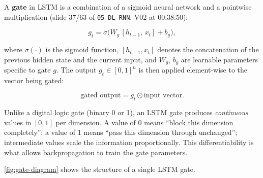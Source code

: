 \documentclass[12pt,a4paper]{article}
\begin{document}
A \textbf{gate} in LSTM is a combination of a sigmoid neural network and a
pointwise multiplication (slide 37/63 of \texttt{05-DL-RNN}, V02 at
00:38:50):

\begin{equation}
  \label{eq:gate-generic}
  g_t = \sigma\!\bigl(W_g\,[h_{t-1},\,x_t] + b_g\bigr),
\end{equation}

where $\sigma(\cdot)$ is the sigmoid function, $[h_{t-1}, x_t]$ denotes
the concatenation of the previous hidden state and the current input, and
$W_g$, $b_g$ are learnable parameters specific to gate $g$. The output
$g_t \in [0,1]^n$ is then applied element-wise to the vector being gated:

\begin{equation}
  \label{eq:gate-apply}
  \text{gated output} = g_t \odot \text{input vector}.
\end{equation}

\begin{keyinsight}[title=Sigmoid as a Soft Gate]
  Unlike a digital logic gate (binary 0 or 1), an LSTM gate produces
  \emph{continuous} values in $[0,1]$ per dimension. A value of 0 means
  ``block this dimension completely''; a value of 1 means ``pass this
  dimension through unchanged''; intermediate values scale the
  information proportionally. This differentiability is what allows
  backpropagation to train the gate parameters.
\end{keyinsight}

\cref{fig:gate-diagram} shows the structure of a single LSTM gate.
\end{document}

